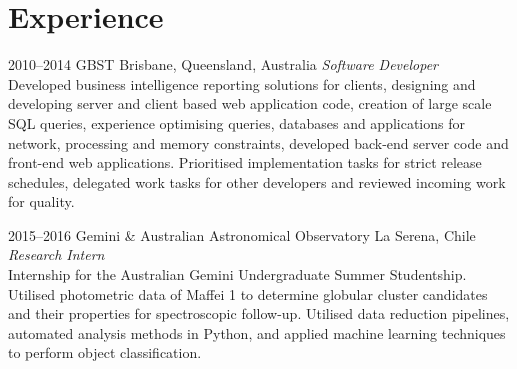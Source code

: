 \documentclass[]{friggeri-cv} %
\begin{document}
\section{Experience}

\begin{entrylist}
\entry
{2010--2014}
{GBST}
{Brisbane, Queensland, Australia}
{\emph{Software Developer} \\
Developed business intelligence reporting solutions for clients, designing and developing server and client based web application code, creation of large scale SQL queries, experience optimising queries, databases and applications for network, processing and memory constraints, developed back-end server code and front-end web applications. Prioritised implementation tasks for strict release schedules, delegated work tasks for other developers and reviewed incoming work for quality.}

\entry
{2015--2016}
{Gemini \& Australian Astronomical Observatory}
{La Serena, Chile}
{\emph{Research Intern} \\
	Internship for the Australian Gemini Undergraduate Summer Studentship. Utilised photometric data of Maffei 1 to determine globular cluster candidates and their properties for spectroscopic follow-up. Utilised data reduction pipelines, automated analysis methods in Python, and applied machine learning techniques to perform object classification.}

\end{entrylist}
\end{document}
